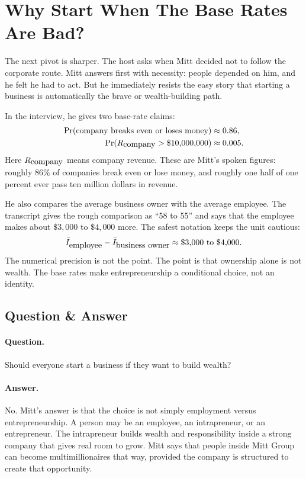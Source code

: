 \section{Why Start When The Base Rates Are Bad?}

The next pivot is sharper. The host asks when Mitt decided not to follow the corporate route. Mitt answers first with necessity: people depended on him, and he felt he had to act. But he immediately resists the easy story that starting a business is automatically the brave or wealth-building path.

In the interview, he gives two base-rate claims:
\begin{align}
  \Pr(\hbox{company breaks even or loses money})
    &\approx 0.86,\\
  \Pr(R_{\hbox{company}}>\$10{,}000{,}000)
    &\approx 0.005.
\end{align}
Here \(R_{\hbox{company}}\) means company revenue. These are Mitt's spoken figures: roughly \(86\%\) of companies break even or lose money, and roughly one half of one percent ever pass ten million dollars in revenue.

He also compares the average business owner with the average employee. The transcript gives the rough comparison as ``58 to 55'' and says that the employee makes about \(\$3{,}000\) to \(\$4{,}000\) more. The safest notation keeps the unit cautious:
\begin{equation}
  \bar I_{\hbox{employee}}
  -
  \bar I_{\hbox{business owner}}
  \approx
  \$3{,}000\hbox{ to }\$4{,}000.
\end{equation}
The numerical precision is not the point. The point is that ownership alone is not wealth. The base rates make entrepreneurship a conditional choice, not an identity.

\subsection{Question \& Answer}

\paragraph{Question.}
Should everyone start a business if they want to build wealth?

\paragraph{Answer.}
No. Mitt's answer is that the choice is not simply employment versus entrepreneurship. A person may be an employee, an intrapreneur, or an entrepreneur. The intrapreneur builds wealth and responsibility inside a strong company that gives real room to grow. Mitt says that people inside Mitt Group can become multimillionaires that way, provided the company is structured to create that opportunity.

